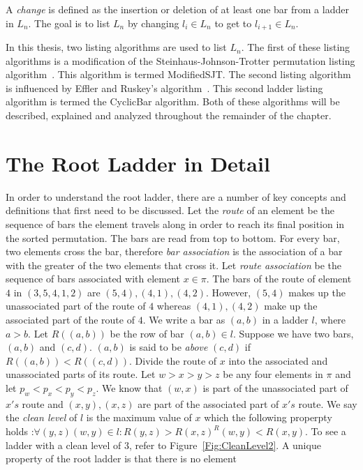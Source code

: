 A \emph{change} 
is defined as the insertion or deletion of at least one bar from a ladder in $L_{n}$. The goal is 
to list $L_{n}$ by changing $l_{i}\in L_{n}$ to get to $l_{i+1} \in L_{n}$.\par
In this thesis, two listing algorithms are used to list $L_{n}$. The first of these listing algorithms 
is a modification of the {\sc Steinhaus-Johnson-Trotter} permutation listing algorithm~\cite{A25}.
This algorithm is termed {\sc ModifiedSJT}.
The second listing algorithm is influenced by Effler and Ruskey's algorithm~\cite{A26}. 
This second ladder listing algorithm is termed the {\sc CyclicBar} algorithm. Both of these algorithms will 
be described, explained and analyzed throughout the remainder of the chapter.\par

\section{The Root Ladder in Detail} 
In order to understand the root ladder, there are a number of key concepts and definitions that first 
need to be discussed.
Let the \emph{route} of an element be the sequence of bars the element travels along in order to reach its final position in the 
sorted permutation. The bars are read from top to bottom. For every bar, two elements cross 
the bar, therefore \emph{bar association} is the association of a bar with the greater of the two elements that 
cross it. Let \emph{route association} be the sequence of bars associated with element $x \in \pi$. 
The bars of the route of element $4$ in $(3,5,4,1,2)$ are 
$(5,4),(4,1),(4,2)$. However, $(5,4)$ makes up the unassociated part of the route of $4$ whereas 
$(4,1),(4,2)$ make up the associated part of the route of $4$. 
We write a bar as $(a,b)$ in a ladder $l$, where $a>b$. Let $R((a,b))$ be the row of bar $(a,b)\in l$. 
Suppose we have two bars, $(a,b)$ and $(c,d)$. $(a,b)$ is said to be \emph{above} $(c,d)$ 
if $R((a,b))<R((c,d))$. Divide the route of $x$ into the associated and unassociated parts of its route. Let $w>x>y>z$ be any four 
elements in $\pi$ and 
let $p_{w}<p_{x}<p_{y}<p_{z}$. We know that $(w,x)$ is part of the unassociated 
part of $x's$ route and $(x,y),(x,z)$ are part of the associated part of $x's$ route. 
We say the \emph{clean level} of $l$ is the maximum value of $x$ which the following properpty holds :$\forall (y,z)(w,y)\in l: R(y,z)>R(x,z) ^ R(w,y)<R(x,y)$. 
To see a ladder with a clean level of $3$, refer to Figure~\ref{Fig:CleanLevel2}. A unique property of the root ladder is that there is no element 
